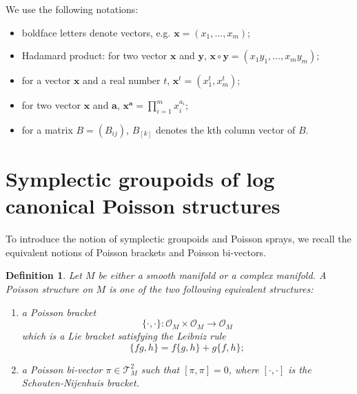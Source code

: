 \documentclass{amsart}
\newtheorem{definition}[theorem]{Definition}
\numberwithin{equation}{section}
\newcommand{\bfa}{\mathbf{a}}
\newcommand{\bfx}{\mathbf{x}}
\newcommand{\bfy}{\mathbf{y}}
\newcommand{\cA}{\mathcal{A}}
\newcommand{\cO}{\mathcal{O}}
\newcommand{\cX}{\mathcal{X}}
\newcommand{\cT}{\mathcal{T}}
\begin{document}
\bigskip


We use the following notations:
\begin{itemize}
	\item boldface letters denote vectors, e.g. $\bfx = (x_1, \ldots, x_m)$;
	\item Hadamard product: for two vector $\bfx$ and $\bfy$, $\bfx \circ \bfy = (x_1y_1, \ldots, x_my_m)$;
	\item for a vector $\bfx$ and a real number $t$, $\bfx^t = (x_1^t, x_m^t)$;
	\item for two vector $\bfx$ and $\bfa$, $\bfx^\bfa = \prod_{i=1}^m x_i^{a_i}$;
	\item for a matrix $B = (B_{ij})$, $B_{[k]}$ denotes the kth column vector of $B$.
\end{itemize}


\section{Symplectic groupoids of log canonical Poisson structures}
\label{sec: local}


To introduce the notion of symplectic groupoids and Poisson sprays, we recall the equivalent notions of Poisson brackets and Poisson bi-vectors.
\begin{definition}
  Let $M$ be either a smooth manifold or a complex manifold.
  A \emph{Poisson structure} on $M$ is one of the two following equivalent structures:
  \begin{enumerate}
    \item a \emph{Poisson bracket}
      $$\{\cdot, \cdot\}: \cO_M \times \cO_M \to \cO_M$$
      which is a Lie bracket satisfying the Leibniz rule
      $$\{fg, h\} = f\{g,h\} + g\{f,h\};$$
    \item a \emph{Poisson bi-vector} $\pi \in \cT^2_M$ such that $[\pi, \pi] = 0$, where $[\cdot, \cdot]$ is the Schouten-Nijenhuis bracket.
  \end{enumerate}	
\end{definition}
\end{document}
